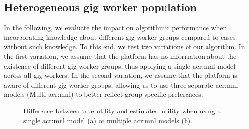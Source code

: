 \subsection{Heterogeneous gig worker population}
\label{sec:res_syn_2}
In the following, we evaluate the impact on algorithmic performance when incorporating knowledge about different gig worker groups compared to cases without such knowledge. To this end, we test two variations of our algorithm. In the first variation, we assume that the platform has no information about the existence of different gig worker groups, thus applying a single \gls{acr:mnl} model across all gig workers. In the second variation, we assume that the platform is aware of different gig worker groups, allowing us to use three separate \gls{acr:mnl} models (Multi \gls{acr:mnl}) to better reflect group-specific preferences. 

\begin{figure}[b!]
    \begin{minipage}{0.62\textwidth}
        \centering
        \hspace*{0.1cm} 
        \caption{\textnormal{Difference between true utility and estimated utility when using a single \gls{acr:mnl} model (a) or multiple \gls{acr:mnl} models (b).}}
        \label{fig:mnl_momnl}
    \end{minipage}%
    \hspace*{0.02\textwidth} %
\end{figure}

